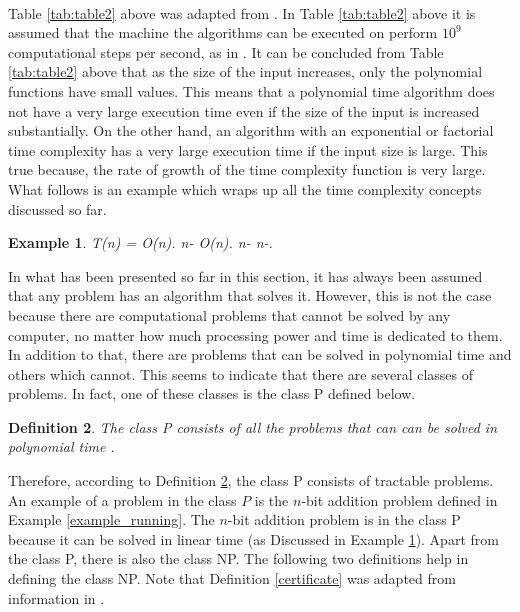 \documentclass[12pt]{article}
\newtheorem{definition}{Definition}[subsection]
\newtheorem{example}[definition]{Example}
\numberwithin{equation}{subsection}
\numberwithin{table}{subsection}
\numberwithin{algorithm}{subsection}
\numberwithin{figure}{subsection}
\begin{document}
\\Table \ref{tab:table2} above was adapted from \cite{pettis}. In Table \ref{tab:table2} above it is assumed that the machine the algorithms can be executed on perform $\mathit{10^9}$ computational steps per second, as in \cite{pettis}. It can be concluded from Table \ref{tab:table2} above that as the size of the input increases, only the polynomial functions have small values. This means that a polynomial time algorithm does not have a very large execution time even if the size of the input is increased substantially. On the other hand, an algorithm with an exponential or factorial time complexity has a very large execution time if the input size is large. This true because, the rate of growth of the time complexity function is very large. What follows is an example which wraps up all the time complexity concepts discussed so far.
\begin{example}
\label{time_complexity_example}
{} T(n) = O(n). {} n-{} O(n). {} n-{} n-{}.
\end{example}
In what has been presented so far in this section, it has always been assumed that any problem has an algorithm that solves it. However, this is not the case because there are computational problems that cannot be solved by any computer, no matter how much processing power and time is dedicated to them. In addition to that, there are problems that can be solved in polynomial time and others which cannot. This seems to indicate that there are several classes of problems. In fact, one of these classes is the class P defined below. \cite{cormen_leiserson_rivest_stein}
\begin{definition}
\label{P}
The class P consists of all the problems that can can be solved in polynomial time {}.
\end{definition}
Therefore, according to Definition \ref{P}, the class P consists of tractable problems. An example of a problem in the class $\mathit{P}$ is the $\mathit{n}$-bit addition problem defined in Example \ref{example_running}. The $\mathit{n}$-bit addition problem is in the class P because it can be solved in linear time (as Discussed in Example \ref{time_complexity_example}). Apart from the class P, there is also the class NP. The following two definitions help in defining the class NP. Note that Definition \ref{certificate} was adapted from information in \cite{kaveh_tehada_2013}.
\end{document}
